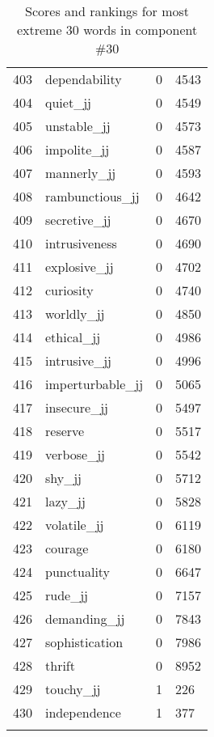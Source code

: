 \begin{longtable}[!htbp]{| rlr@{.}l |}
    403 & dependability & 0 & 4543 \\
    404 & quiet\_jj & 0 & 4549 \\
    405 & unstable\_jj & 0 & 4573 \\
    406 & impolite\_jj & 0 & 4587 \\
    407 & mannerly\_jj & 0 & 4593 \\
    408 & rambunctious\_jj & 0 & 4642 \\
    409 & secretive\_jj & 0 & 4670 \\
    410 & intrusiveness & 0 & 4690 \\
    411 & explosive\_jj & 0 & 4702 \\
    412 & curiosity & 0 & 4740 \\
    413 & worldly\_jj & 0 & 4850 \\
    414 & ethical\_jj & 0 & 4986 \\
    415 & intrusive\_jj & 0 & 4996 \\
    416 & imperturbable\_jj & 0 & 5065 \\
    417 & insecure\_jj & 0 & 5497 \\
    418 & reserve & 0 & 5517 \\
    419 & verbose\_jj & 0 & 5542 \\
    420 & shy\_jj & 0 & 5712 \\
    421 & lazy\_jj & 0 & 5828 \\
    422 & volatile\_jj & 0 & 6119 \\
    423 & courage & 0 & 6180 \\
    424 & punctuality & 0 & 6647 \\
    425 & rude\_jj & 0 & 7157 \\
    426 & demanding\_jj & 0 & 7843 \\
    427 & sophistication & 0 & 7986 \\
    428 & thrift & 0 & 8952 \\
    429 & touchy\_jj & 1 & 226 \\
    430 & independence & 1 & 377 \\
    \hline
    \caption{Scores and rankings for most extreme 30 words in component \#30} \\
\end{longtable}
